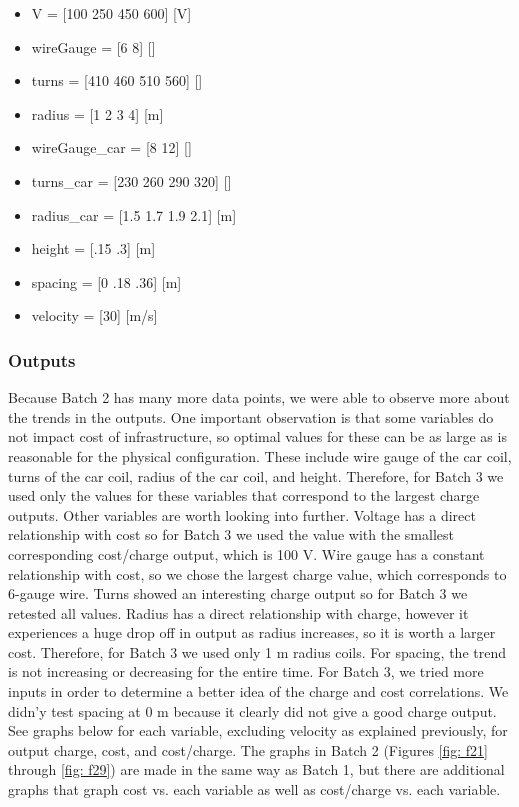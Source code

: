 \begin{itemize}
    \item V = [100 250 450 600] [V]
    \item wireGauge = [6 8] []
    \item turns = [410 460 510 560] []
    \item radius = [1 2 3 4] [m]
    \item wireGauge\_car = [8 12] []
    \item turns\_car = [230 260 290 320] []
    \item radius\_car = [1.5 1.7 1.9 2.1] [m]
    \item height = [.15 .3] [m]
    \item spacing = [0 .18 .36] [m]
    \item velocity = [30] [m/s]
\end{itemize}

\subsubsection{Outputs}
Because Batch 2 has many more data points, we were able to observe more about the trends in the outputs. 
One important observation is that some variables do not impact cost of infrastructure, so optimal values 
for these can be as large as is reasonable for the physical configuration. These include wire gauge of the car 
coil, turns of the car coil, radius of the car coil, and height. Therefore, for Batch 3 we used only the values 
for these variables that correspond to the largest charge outputs. Other variables are worth looking into further. 
Voltage has a direct relationship with cost so for Batch 3 we used the value with the smallest corresponding 
cost/charge output, which is 100 V. Wire gauge has a constant relationship with cost, so we chose the largest 
charge value, which corresponds to 6-gauge wire.  Turns showed an interesting charge output so for Batch 3 we 
retested all values. Radius has a direct relationship with charge, however it experiences a huge drop off in output 
as radius increases, so it is worth a larger cost. Therefore, for Batch 3 we used only 1 m radius coils. 
For spacing, the trend is not increasing or decreasing for the entire time. For Batch 3, we tried more inputs 
in order to determine a better idea of the charge and cost correlations. We didn’y test spacing at 0 m because 
it clearly did not give a good charge output. See graphs below for each variable, excluding velocity as explained 
previously, for output charge, cost, and cost/charge. The graphs in Batch 2 (Figures \ref{fig: f21} through \ref{fig: f29}) are made in the same way as Batch 1, 
but there are additional graphs that graph cost vs. each variable as well as cost/charge vs. each variable.


